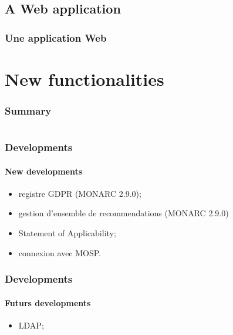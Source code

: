 \documentclass[]{beamer}
\begin{document}
\subsection{A Web application}
\begin{frame}
    \frametitle{Une application Web}
    \framesubtitle{}
\end{frame}




%
%
\section{New functionalities}
\begin{frame}
    \frametitle{Summary}
    \begin{columns}[t]
        \begin{column}{5cm}
            \tableofcontents[sections={1-3}, currentsection, hideothersubsections]
        \end{column}
        \begin{column}{5cm}
            \tableofcontents[sections={4-5}, currentsection, hideothersubsections]
        \end{column}
    \end{columns}
\end{frame}

\begin{frame}
    \frametitle{Developments}
    \framesubtitle{New developments}
    \begin{itemize}
        \item registre GDPR (MONARC 2.9.0);
        \item gestion d'ensemble de recommendations (MONARC 2.9.0)
        \item Statement of Applicability;
        \item connexion avec MOSP.
    \end{itemize}
\end{frame}

\begin{frame}
    \frametitle{Developments}
    \framesubtitle{Futurs developments}
    \begin{itemize}
        \item LDAP;
        
    \end{itemize}
\end{frame}




%
%
\end{document}
